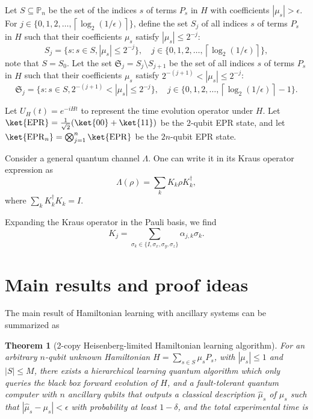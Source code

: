 \documentclass[twocolumn,superscriptaddress,aps,showpacs,amsmath,amstex,amssymb,citeautoscript,floatfix,pra,preprintnumbers]{revtex4-2}
\newcounter{alg}
\newtheorem{theorem}{Theorem}
\theoremstyle{plain}
\theoremstyle{plain}
\theoremstyle{plain}
\theoremstyle{plain}
\theoremstyle{plain}
\theoremstyle{plain}
\newcommand{\EPR}{\mathrm{EPR}}
\begin{document}
\begin{appendix}
Let $S\subseteq \mathbb{P}_n$ be the set of the indices $s$ of terms $P_s$ in $H$ with coefficients $|\mu_s|>\epsilon$. 
For $j\in\{0,1,2,\ldots,\left\lceil \log_2(1/\epsilon) \right\rceil\}$, define the set $S_j$ of all indices $s$ of terms $P_s$ in $H$ such that their coefficients $\mu_s$ satisfy $|\mu_s|\leq 2^{-j}$:
\begin{equation}
\label{eq:S_j}
    S_j = \{s: s\in S, |\mu_s|\leq 2^{-j}\},\quad j\in\{0,1,2,\ldots,\left\lceil \log_2(1/\epsilon) \right\rceil\},
\end{equation}
note that $S=S_0$. Let the set $\mathfrak{S}_j = S_j\setminus S_{j+1}$ be the set of all indices $s$ of terms $P_s$ in $H$ such that their coefficients $\mu_s$ satisfy $2^{-(j+1)}<|\mu_s|\leq 2^{-j}$:
\begin{equation}
    \mathfrak{S}_j = \{s: s\in S, 2^{-(j+1)} < |\mu_s|\leq 2^{-j}\},\quad j\in\{0,1,2,\ldots,\left\lceil \log_2(1/\epsilon) \right\rceil-1\}.
\end{equation}

Let $U_H(t) = e^{-iHt}$ to represent the time evolution operator under $H$.
Let $\ket{\EPR} = \frac{1}{\sqrt{2}}(\ket{00}+\ket{11})$ be the $2$-qubit EPR state, and let $\ket{\EPR_n} = \bigotimes_{j=1}^n\ket{\EPR}$ be the $2n$-qubit EPR state.

Consider a general quantum channel $\Lambda$.  
One can write it in its Kraus operator expression as
\begin{equation}
\label{eq:Kraus_operator}
    \Lambda (\rho) = \sum_kK_k\rho K_k^\dagger,
\end{equation}
where $\sum_k K_k^\dagger K_k = I$. 

Expanding the Kraus operator in the Pauli basis, we find
\begin{equation}
\label{eq:Pauli_expansion_of_Kraus}
    K_j = \sum_{\sigma_{k}\in\{I,\sigma_x,\sigma_y,\sigma_z\}} \alpha_{j,k}\sigma_{k}.
\end{equation}


\section{Main results and proof ideas\label{app:main_ancillary}}
The main result of Hamiltonian learning with ancillary systems can be summarized as
\begin{theorem}[2-copy Heisenberg-limited Hamiltonian learning algorithm]
\label{thm:2-copy_learning_alg}
For an arbitrary $n$-qubit unknown Hamiltonian $H=\sum_{s\in S}\mu_s P_{s}$, with $|\mu_s|\leq 1$ and $|S|\leq M$, there exists a hierarchical learning quantum algorithm which only queries the black box forward evolution of $H$, and a fault-tolerant quantum computer with $n$ ancillary qubits that outputs a classical description $\hat{\mu}_s$ of $\mu_s$ such that $|\hat{\mu}_s-\mu_s|<\epsilon$ with probability at least $1-\delta$, and the total experimental time is 


\end{theorem}
\end{appendix}
\end{document}
